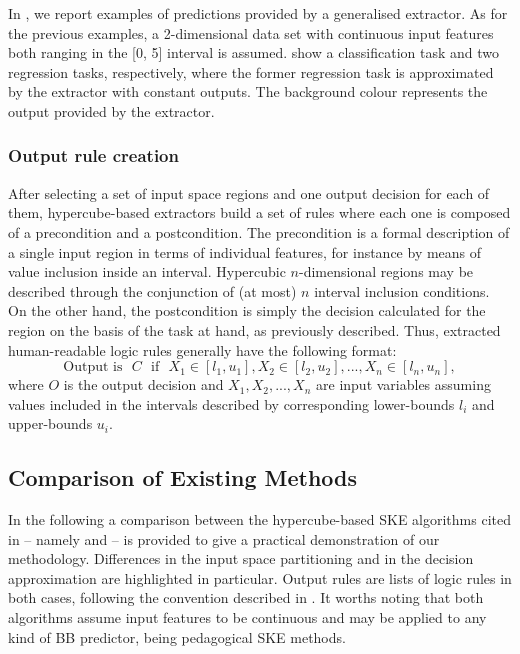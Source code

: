 \documentclass[
]{ceurart}
\begin{document}


In , we report examples of predictions provided by a generalised extractor.
%
As for the previous examples, a 2-dimensional data set with continuous input features both ranging in the [0, 5] interval is assumed.
%
 show a classification task and two regression tasks, respectively, where the former regression task is approximated by the extractor with constant outputs.
%
The background colour represents the output provided by the extractor.

\subsubsection{Output rule creation}\label{ssec:rule}

After selecting a set of input space regions and one output decision for each of them, hypercube-based extractors build a set of rules where each one is composed of a precondition and a postcondition.
%
The precondition is a formal description of a single input region in terms of individual features, for instance by means of value inclusion inside an interval.
%
Hypercubic $n$-dimensional regions may be described through the conjunction of (at most) $n$ interval inclusion conditions.
%
On the other hand, the postcondition is simply the decision calculated for the region on the basis of the task at hand, as previously described.
%
Thus, extracted human-readable logic rules generally have the following format:
%
\begin{equation*}
	\text{Output is ~} C \text{~ if ~} X_1 \in [l_1, u_1], X_2 \in [l_2, u_2], ..., X_n \in [l_n, u_n],
\end{equation*}
%
where $O$ is the output decision and $X_1, X_2, ..., X_n$ are input variables assuming values included in the intervals described by corresponding lower-bounds $l_i$ and upper-bounds $u_i$.

\subsection{Comparison of Existing Methods}

In the following a comparison between the hypercube-based SKE algorithms cited in  -- namely \iter{} and \gridex{} -- is provided to give a practical demonstration of our methodology.
%
Differences in the input space partitioning and in the decision approximation are highlighted in particular.
%
Output rules are lists of logic rules in both cases, following the convention described in .
%
It worths noting that both algorithms assume input features to be continuous and may be applied to any kind of BB predictor, being pedagogical SKE methods.
\end{document}
